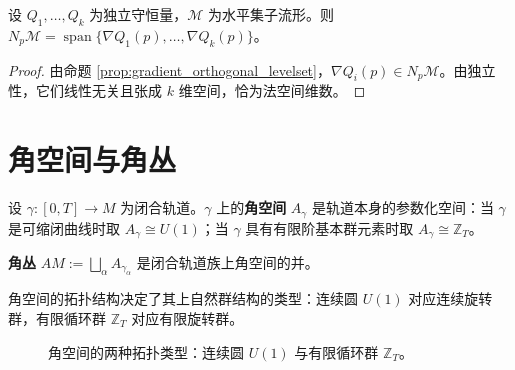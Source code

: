 \begin{proposition}[守恒量梯度与法空间]\label{prop:normal_bundle_constraint}
设 $Q_1, \dots, Q_k$ 为独立守恒量，$\mathcal{M}$ 为水平集子流形。则 $N_p\mathcal{M} = \operatorname{span}\{\nabla Q_1(p), \dots, \nabla Q_k(p)\}$。
\end{proposition}

\begin{proof}
由命题 \ref{prop:gradient_orthogonal_levelset}，$\nabla Q_i(p) \in N_p\mathcal{M}$。由独立性，它们线性无关且张成 $k$ 维空间，恰为法空间维数。
\end{proof}

\section{角空间与角丛}

\begin{definition}[角空间]\label{def:angle_space}
设 $\gamma: [0, T] \to M$ 为闭合轨道。$\gamma$ 上的\textbf{角空间} $A_\gamma$ 是轨道本身的参数化空间：当 $\gamma$ 是可缩闭曲线时取 $A_\gamma \cong U(1)$；当 $\gamma$ 具有有限阶基本群元素时取 $A_\gamma \cong \mathbb{Z}_T$。
\end{definition}

\begin{definition}[角丛]\label{def:angle_bundle}
\textbf{角丛} $AM := \bigsqcup_{\alpha} A_{\gamma_\alpha}$ 是闭合轨道族上角空间的并。
\end{definition}

\begin{proposition}[角空间的代数结构]\label{prop:angle_space_topology}
角空间的拓扑结构决定了其上自然群结构的类型：连续圆 $U(1)$ 对应连续旋转群，有限循环群 $\mathbb{Z}_T$ 对应有限旋转群。
\end{proposition}

\begin{figure}[htbp]
\centering
{}
\caption{角空间的两种拓扑类型：连续圆 $U(1)$ 与有限循环群 $\mathbb{Z}_T$。}
\label{fig:angle_space}
\end{figure}


